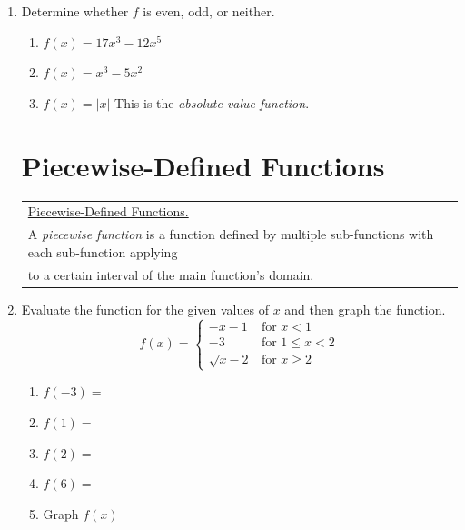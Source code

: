 \documentclass[11pt]{article}
\begin{document}
\begin{enumerate}
\item Determine whether $f$ is even, odd, or neither. 
\begin{enumerate}
\item $f(x)=17x^3-12x^5$\\[1in]
\item $f(x)=x^3-5x^2$\\[1in]
\item $f(x)=|x|$ This is the \emph{absolute value function}. \\[1in]%
\end{enumerate}



\newpage


\section{Piecewise-Defined Functions}
\hspace{-.4in} \begin{tabular}{| l |} \hline \underline{Piecewise-Defined Functions.}  \\
A \emph{piecewise function} is a function defined by multiple sub-functions with each sub-function applying\\ to a certain interval of the main function's domain.\\
 \hline
\end{tabular}



\item Evaluate the function for the given values of $x$ and then graph the function.
\[
  f(x) =
  \begin{cases}
                                   -x-1 & \text{for $x<1$} \\
                                   -3 & \text{for $1 \leq x <2$} \\
  \sqrt{x-2} & \text{for $x \geq 2$}
  \end{cases}
\]

\begin{enumerate}
\item $f(-3)=$\\[.2in]
\item $f(1)=$ \\[.2in]
\item $f(2)=$ \\[.2in]
\item $f(6)=$ \\[.2in]
\item Graph $f(x)$
\end{enumerate}



\end{enumerate}
\end{document}
